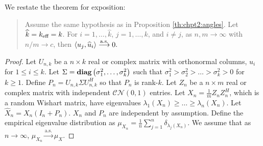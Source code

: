 We restate the theorem for exposition:
\begin{quote}
Assume the same hypothesis as in Proposition \ref{th:chpt2:angles}. Let
$\widehat{k}=k_\text{eff}=k$. For $i=1,\dots,\widehat{k}$, $j=1,\dots,k$, and $i\neq j$, as
$n,m\to\infty$ with $n/m\to c$, then $\langle u_j,\widehat{u}_i\rangle \overset{\textrm{a.s.}}{\longrightarrow} 0.$
\end{quote}
\begin{proof}
Let $U_{n,k}$ be a $n\times k$ real or complex matrix with orthonormal columns, $u_i$ for $1\leq i\leq k$. Let $\Sigma = \mathop{\bf diag}\left(\sigma_1^2,\dots,\sigma_k^2\right)$ such that $\sigma_1^2>\sigma_2^2>\dots>\sigma_k^2>0$ for $k\geq 1$. Define $P_n=U_{n,k}\Sigma U_{n,k}^H$ so that $P_n$ is rank-$k$. Let $Z_n$ be a $n\times m$ real or complex matrix with independent $\mathcal{CN}\left(0,1\right)$ entries. Let $X_n=\frac{1}{m}Z_nZ_n^H$, which is a random Wishart matrix, have eigenvalues $\lambda_1(X_n)\geq\dots\geq\lambda_n(X_n)$. Let $\widehat{X}_n=X_n\left(I_n+P_n\right)$. $X_n$ and $P_n$ are independent by assumption. Define the empirical eigenvalue distribution as $\mu_{X_n}=\frac{1}{n}\sum_{j=1}^n\delta_{\lambda_j\left(X_n\right)}$. We assume that as $n\to\infty$, $\mu_{X_n}\overset{\text{a.s.}}{\longrightarrow}\mu_X$.



\end{proof}
